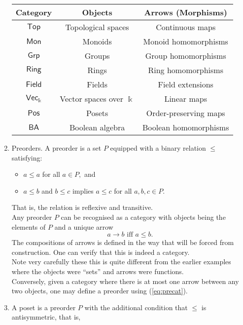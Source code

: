 \begin{enumerate}
	\begin{center}
		\begin{tabular}{|c|c|c|}
		\hline
		Category & Objects & Arrows (Morphisms)\\
		\hline
		$\mathsf{Top}$ & Topological spaces & Continuous maps\\
		$\mathsf{Mon}$ & Monoids & Monoid homomorphisms\\
		$\mathsf{Grp}$ & Groups & Group homomorphisms\\
		$\mathsf{Ring}$ & Rings & Ring homomorphisms\\
		$\mathsf{Field}$ & Fields & Field extensions\\
		$\mathsf{Vec}_\Bbbk$ & Vector spaces over $\Bbbk$ & Linear maps\\
		$\mathsf{Pos}$ & Posets & Order-preserving maps\\
		$\mathsf{BA}$ & Boolean algebra & Boolean homomorphisms\\
		\hline
		\end{tabular}
	\end{center}
	\item Preorders. A preorder is a set $P$ equipped with a binary relation $\le$ satisfying:
	\begin{itemize}
		\item $a \le a$ for all $a \in P,$ and
		\item $a \le b$ and $b \le c$ implies $a \le c$ for all $a, b, c \in P.$
	\end{itemize}
	That is, the relation is reflexive and transitive.\\
	Any preorder $P$ can be recognised as a category with objects being the elements of $P$ and a unique arrow 
	\begin{equation} \label{eq:precat}
		a \to b \text{ iff } a \le b.
	\end{equation}
	The compositions of arrows is defined in the way that will be forced from construction. One can verify that this is indeed a category.\\
	Note very carefully these this is quite different from the earlier examples where the objects were ``sets'' and  arrows were functions.\\
	Conversely, given a category where there is at most one arrow between any two objects, one may define a preorder using (\ref{eq:precat}).
	\item A poset is a preorder $P$ with the additional condition that $\le$ is antisymmetric, that is,
	\begin{equation*} 

\end{equation*}
\end{enumerate}
